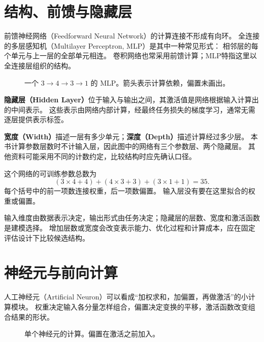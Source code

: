 \section{结构、前馈与隐藏层}
\label{sec:nn-structure}

前馈神经网络（Feedforward Neural Network）的计算连接不形成有向环。
全连接的多层感知机（Multilayer Perceptron, MLP）是其中一种常见形式：
相邻层的每个单元与上一层的全部单元相连。
卷积网络也常采用前馈计算；MLP特指这里以全连接层组织的结构。

\begin{figure}[htbp]
\centering

\caption{一个 $3\!\to\!4\!\to\!3\!\to\!1$ 的 MLP。箭头表示计算依赖，偏置未画出。}
\label{fig:network}
\par\smallskip
{}
\end{figure}

\textbf{隐藏层（Hidden Layer）}位于输入与输出之间，其激活值是网络根据输入计算出的中间表示。
这些表示由网络内部计算，经最终任务损失的梯度学习，通常无需逐层提供表示标签。

\textbf{宽度（Width）}描述一层有多少单元；\textbf{深度（Depth）}描述计算经过多少层。
本书计算参数层数时不计输入层，因此图中的网络有三个参数层、两个隐藏层。
其他资料可能采用不同的计数约定，比较结构时应先确认口径。

这个网络的可训练参数总数为
\[
 (3\times4+4)+(4\times3+3)+(3\times1+1)=35.
\]
每个括号中的前一项数连接权重，后一项数偏置。
输入层没有要在这里拟合的权重或偏置。

\begin{keyidea}[输入、表示与输出]
输入维度由数据表示决定，输出形式由任务决定；隐藏层的层数、宽度和激活函数是建模选择。
增加层数或宽度会改变表示能力、优化过程和计算成本，应在固定评估设计下比较候选结构。
\end{keyidea}

\section{神经元与前向计算}
\label{sec:nn-forward}

人工神经元（Artificial Neuron）可以看成“加权求和，加偏置，再做激活”的小计算模块。
权重决定输入各分量怎样组合，偏置决定变换的平移，激活函数改变组合结果的形状。

\begin{figure}[htbp]
\centering

\caption{单个神经元的计算。偏置在激活之前加入。}
\label{fig:neuron}
\par\smallskip
{}
\end{figure}

